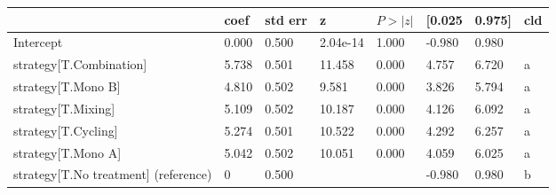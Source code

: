 \begin{tabular}{llllllll}
\toprule
 & coef & std err & z & $P>|z|$ & [0.025 & 0.975] & cld \\
\midrule
Intercept & 0.000 & 0.500 &  2.04e-14 &  1.000 & -0.980 & 0.980 &  \\
strategy[T.Combination] & 5.738 & 0.501 &    11.458 &  0.000 & 4.757 & 6.720 & a \\
strategy[T.Mono B] & 4.810 & 0.502 &     9.581 &  0.000 & 3.826 & 5.794 & a \\
strategy[T.Mixing] & 5.109 & 0.502 &    10.187 &  0.000 & 4.126 & 6.092 & a \\
strategy[T.Cycling] & 5.274 & 0.501 &    10.522 &  0.000 & 4.292 & 6.257 & a \\
strategy[T.Mono A] & 5.042 & 0.502 &    10.051 &  0.000 & 4.059 & 6.025 & a \\
strategy[T.No treatment] (reference) & 0 & 0.500 &  &  & -0.980 & 0.980 & b \\
\bottomrule
\end{tabular}
